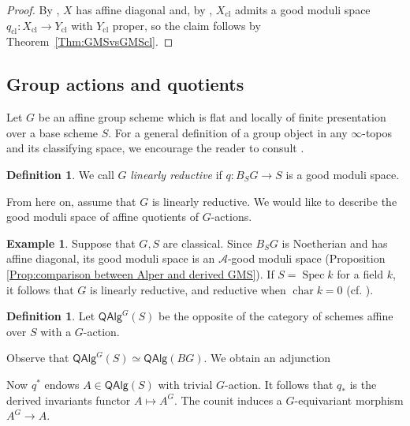 \documentclass[a4paper,twoside,11pt]{amsart}
\theoremstyle{plain}
\theoremstyle{definition}
\newtheorem{definition}[theorem]{Definition}
\newtheorem{example}[theorem]{Example}
\theoremstyle{remark}
\numberwithin{equation}{section}
\DeclareMathOperator{\chr}{char}
\newcommand{\QAlg}{\mathsf{QAlg}}
\DeclareMathOperator{\Spec}{Spec} %
\newcommand{\cl}{\mathrm{cl}} %
\begin{document}
\begin{proof}
    By \cite[Lemma~7.20]{AlperExistence}, $X$ has affine diagonal and, by \cite[Theorem~7.23]{AlperExistence}, $X_\cl$ admits a good moduli space $q_\cl \colon X_\cl \to Y_\cl$ with $Y_\cl$ proper, so the claim follows by Theorem~\ref{Thm:GMSvsGMScl}.
\end{proof}

\subsection{Group actions and quotients} \label{subsection:group action examples}
Let $G$ be an affine group scheme which is flat and locally of finite presentation over a base scheme $S$. For a general definition of a group object in any $\infty$-topos and its classifying space, we encourage the reader to consult \cite{NikolausOOBundles}.
\begin{definition}
    We call $G$ \emph{linearly reductive} if $q \colon B_S G \to S$ is a good moduli space.
\end{definition}
From here on, assume that $G$ is linearly reductive. We would like to describe the good moduli space of affine quotients of $G$-actions.

\begin{example}
    Suppose that $G,S$ are classical. Since $B_SG$ is Noetherian and has affine diagonal, its good moduli space is an $\mathcal{A}$-good moduli space (Proposition \ref{Prop:comparison between Alper and derived GMS}). If $S = \Spec k$ for a field $k$, it follows that $G$ is linearly reductive, and reductive when $\chr k = 0$ (cf. \cite[Section~12]{AlperGood}). 
\end{example}

\begin{definition}
    Let $\QAlg^G(S)$ be the opposite of the category of schemes affine over $S$ with a $G$-action. 
\end{definition}


Observe that $\QAlg^G(S) \simeq \QAlg(BG)$. We obtain an adjunction
    \begin{center}
    \end{center}   
Now $q^*$ endows $A \in \QAlg(S)$ with trivial $G$-action. It follows that $q_*$ is the derived invariants functor $A \mapsto A^G$. The counit induces a $G$-equivariant morphism $A^G \to A$.
\end{document}
